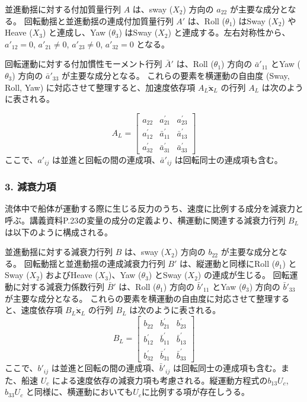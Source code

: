 \documentclass{article}
\begin{document}
並進動揺に対する付加質量行列 $A$ は、sway ($X_2$) 方向の $a_{22}$ が主要な成分となる。
回転動揺と並進動揺の連成付加質量行列 $A'$ は、Roll ($\theta_1$) はSway ($X_2$) やHeave ($X_3$) と連成し、Yaw ($\theta_3$) はSway ($X_2$) と連成する。左右対称性から、$a'_{12}=0$, $a'_{21} \neq 0$, $a'_{23} \neq 0$, $a'_{32}=0$ となる。

回転運動に対する付加慣性モーメント行列 $\bar{A}'$ は、Roll ($\theta_1$) 方向の $\bar{a}'_{11}$ とYaw ($\theta_3$) 方向の $\bar{a}'_{33}$ が主要な成分となる。
これらの要素を横運動の自由度 (Sway, Roll, Yaw) に対応させて整理すると、加速度依存項 $A_L \ddot{\mathbf{x}}_L$ の行列 $A_L$ は次のように表される。

$$
A_L = \begin{bmatrix}
a_{22} & a_{21}^{\prime} & a_{23}^{\prime} \\
a_{12}^{\prime} & \bar{a}_{11}^{\prime} & \bar{a}_{13}^{\prime} \\
a_{32}^{\prime} & \bar{a}_{31}^{\prime} & \bar{a}_{33}^{\prime}
\end{bmatrix}
$$
ここで、$a'_{ij}$ は並進と回転の間の連成項、$\bar{a}'_{ij}$ は回転同士の連成項も含む。

\subsubsection*{3. 減衰力項}
流体中で船体が運動する際に生じる反力のうち、速度に比例する成分を減衰力と呼ぶ。講義資料P.23の変量の成分の定義より、横運動に関連する減衰力行列 $B_L$ は以下のように構成される。

並進動揺に対する減衰力行列 $B$ は、sway ($X_2$) 方向の $b_{22}$ が主要な成分となる。
回転動揺と並進動揺の連成減衰力行列 $B'$ は、縦運動と同様にRoll ($\theta_1$) とSway ($X_2$) およびHeave ($X_3$)、Yaw ($\theta_3$) とSway ($X_2$) の連成が生じる。
回転運動に対する減衰力係数行列 $\bar{B}'$ は、Roll ($\theta_1$) 方向の $\bar{b}'_{11}$ とYaw ($\theta_3$) 方向の $\bar{b}'_{33}$ が主要な成分となる。
これらの要素を横運動の自由度に対応させて整理すると、速度依存項 $B_L \dot{\mathbf{x}}_L$ の行列 $B_L$ は次のように表される。
$$
B_L = \begin{bmatrix}
b_{22} & b_{21}^{\prime} & b_{23}^{\prime} \\
b_{12}^{\prime} & \bar{b}_{11}^{\prime} & \bar{b}_{13}^{\prime} \\
b_{32}^{\prime} & \bar{b}_{31}^{\prime} & \bar{b}_{33}^{\prime}
\end{bmatrix}
$$
ここで、$b'_{ij}$ は並進と回転の間の連成項、$\bar{b}'_{ij}$ は回転同士の連成項も含む。また、船速 $U_c$ による速度依存の減衰力項も考慮される。縦運動方程式の$b_{13}U_c$, $b_{33}U_c$ と同様に、横運動においても$U_c$に比例する項が存在しうる。
\end{document}
